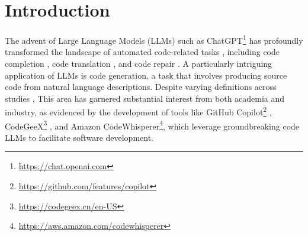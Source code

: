 \section{Introduction}\label{sec:introduction}
The advent of Large Language Models (LLMs) such as ChatGPT\footnote{\href{https://chat.openai.com/}{https://chat.openai.com}} \cite{gpt-3.5-turbo} has profoundly transformed the landscape of automated code-related tasks \cite{chen2021evaluating}, including code completion \cite{wang2021code,lu2022reacc,guo2023longcoder,wu2024repoformer}, code translation \cite{lachaux2020unsupervised,szafraniec2022code,chen2018tree}, and code repair \cite{olausson2023self,fan2023automated,joshi2023repair,parasaram2024fact,xu2024aligning,zhang2024pydex}. 
A particularly intriguing application of LLMs is code generation, a task that involves producing source code from natural language descriptions. Despite varying definitions across studies \cite{ren2020codebleu,chen2023teaching,shojaee2023execution,wang2023codet5+},  
This area has garnered substantial interest from both academia and industry, as evidenced by the development of tools like GitHub Copilot\footnote{\href{https://github.com/features/copilot}{https://github.com/features/copilot}} \cite{chen2021evaluating}, CodeGeeX\footnote{\href{https://codegeex.cn/en-US}{https://codegeex.cn/en-US}} \cite{zheng2023codegeex}, and Amazon CodeWhisperer\footnote{\href{https://aws.amazon.com/codewhisperer}{https://aws.amazon.com/codewhisperer}}, which leverage groundbreaking code LLMs to facilitate software development.

